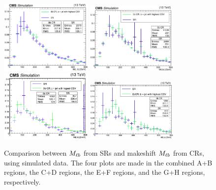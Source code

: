 \begin{figure}[htbp]
\centering
\includegraphics[width=0.4\textwidth]{figures/cr0b_Mlbshape_AB.png}
\includegraphics[width=0.4\textwidth]{figures/cr0b_Mlbshape_CD.png}
\includegraphics[width=0.4\textwidth]{figures/cr0b_Mlbshape_EF.png}
\includegraphics[width=0.4\textwidth]{figures/cr0b_Mlbshape_GH.png}
\caption{Comparison between $M_{\ell b}$ from SRs and makeshift $M_{\ell b}$
   from CRs, using simulated data. The four plots are made in the
  combined A+B regions, the C+D regions, the E+F regions, and the G+H
  regions, respectively.}
\label{fig:stop:1lw:mlb}
\end{figure}

